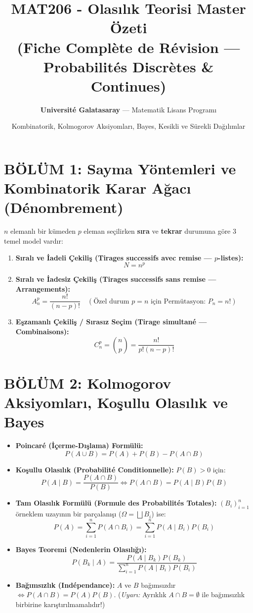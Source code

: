 \documentclass[11pt,a4paper]{article}
\title{\vspace{-1.2cm}\textbf{\Huge MAT206 - Olasılık Teorisi Master Özeti}\\\Large (Fiche Complète de Révision --- Probabilités Discrètes \& Continues)}
\author{\textbf{Université Galatasaray} --- Matematik Lisans Programı}
\date{\small Kombinatorik, Kolmogorov Aksiyomları, Bayes, Kesikli ve Sürekli Dağılımlar}
\begin{document}
\shorthandoff{=}
\maketitle
\vspace{-0.5cm}

\section*{BÖLÜM 1: Sayma Yöntemleri ve Kombinatorik Karar Ağacı (Dénombrement)}

\begin{tcolorbox}[colback=blue!5!white,colframe=blue!75!black,title=\textbf{Seçim Modeli Nasıl Belirlenir? (Tirages dans une Urne)}]
$n$ elemanlı bir kümeden $p$ eleman seçilirken \textbf{sıra} ve \textbf{tekrar} durumuna göre 3 temel model vardır:
\begin{enumerate}[leftmargin=*]
    \item \textbf{Sıralı ve İadeli Çekiliş (Tirages successifs avec remise --- $p$-listes):}
    \[ N = n^p \]
    \item \textbf{Sıralı ve İadesiz Çekiliş (Tirages successifs sans remise --- Arrangements):}
    \[ A_n^p = \frac{n!}{(n-p)!} \quad (\text{Özel durum } p=n \text{ için Permütasyon: } P_n = n!) \]
    \item \textbf{Eşzamanlı Çekiliş / Sırasız Seçim (Tirage simultané --- Combinaisons):}
    \[ C_n^p = \binom{n}{p} = \frac{n!}{p!(n-p)!} \]
\end{enumerate}
\end{tcolorbox}

\section*{BÖLÜM 2: Kolmogorov Aksiyomları, Koşullu Olasılık ve Bayes}

\begin{tcolorbox}[colback=purple!5!white,colframe=purple!75!black,title=\textbf{Olasılık Uzayı $(\Omega, \mathcal{F}, P)$ ve Temel Teoremler}]
\begin{itemize}[leftmargin=*]
    \item \textbf{Poincaré (İçerme-Dışlama) Formülü:}
    \[ P(A \cup B) = P(A) + P(B) - P(A \cap B) \]
    \item \textbf{Koşullu Olasılık (Probabilité Conditionnelle):} $P(B) > 0$ için:
    \[ P(A \mid B) = \frac{P(A \cap B)}{P(B)} \iff P(A \cap B) = P(A \mid B) P(B) \]
    \item \textbf{Tam Olasılık Formülü (Formule des Probabilités Totales):} $(B_i)_{i=1}^n$ örneklem uzayının bir parçalanışı ($\Omega = \bigsqcup B_i$) ise:
    \[ P(A) = \sum_{i=1}^n P(A \cap B_i) = \sum_{i=1}^n P(A \mid B_i) P(B_i) \]
    \item \textbf{Bayes Teoremi (Nedenlerin Olasılığı):}
    \[ P(B_k \mid A) = \frac{P(A \mid B_k) P(B_k)}{\sum_{i=1}^n P(A \mid B_i) P(B_i)} \]
    \item \textbf{Bağımsızlık (Indépendance):} $A$ ve $B$ bağımsızdır $\iff P(A \cap B) = P(A)P(B)$. (\textit{Uyarı:} Ayrıklık $A \cap B = \emptyset$ ile bağımsızlık birbirine karıştırılmamalıdır!)
\end{itemize}
\end{tcolorbox}
\end{document}
